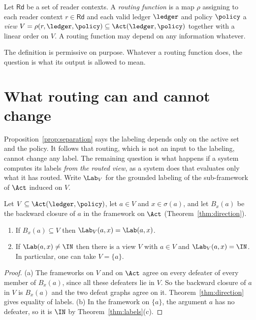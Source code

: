 \begin{definition}\label{def:routing}
Let $\mathsf{Rd}$ be a set of reader contexts. A \emph{routing function} is a map $\rho$ assigning to each reader context $r\in\mathsf{Rd}$ and each valid ledger $\ledger$ and policy $\policy$ a \emph{view} $V=\rho(r,\ledger,\policy)\subseteq\Act(\ledger,\policy)$ together with a linear order on $V$. A routing function may depend on any information whatever.
\end{definition}

The definition is permissive on purpose. Whatever a routing function does, the question is what its output is allowed to mean.

\section{What routing can and cannot change}\label{sec:routechange}

Proposition~\ref{prop:separation} says the labeling depends only on the active set and the policy. It follows that routing, which is not an input to the labeling, cannot change any label. The remaining question is what happens if a system computes its labels \emph{from the routed view}, as a system does that evaluates only what it has routed. Write $\Lab_V$ for the grounded labeling of the sub-framework of $\Act$ induced on $V$.

\begin{proposition}\label{prop:localview}
Let $V\subseteq\Act(\ledger,\policy)$, let $a\in V$ and $x\in\sigma(a)$, and let $B_x(a)$ be the backward closure of $a$ in the framework on $\Act$ (Theorem~\ref{thm:direction}).
\begin{enumerate}[label=(\alph*)]
\item If $B_x(a)\subseteq V$ then $\Lab_V(a,x)=\Lab(a,x)$.
\item If $\Lab(a,x)\ne\IN$ then there is a view $V$ with $a\in V$ and $\Lab_V(a,x)=\IN$. In particular, one can take $V=\{a\}$.
\end{enumerate}
\end{proposition}

\begin{proof}
(a) The frameworks on $V$ and on $\Act$ agree on every defeater of every member of $B_x(a)$, since all these defeaters lie in $V$. So the backward closure of $a$ in $V$ is $B_x(a)$ and the two defeat graphs agree on it. Theorem~\ref{thm:direction} gives equality of labels. (b) In the framework on $\{a\}$, the argument $a$ has no defeater, so it is $\IN$ by Theorem~\ref{thm:labels}(c).
\end{proof}

